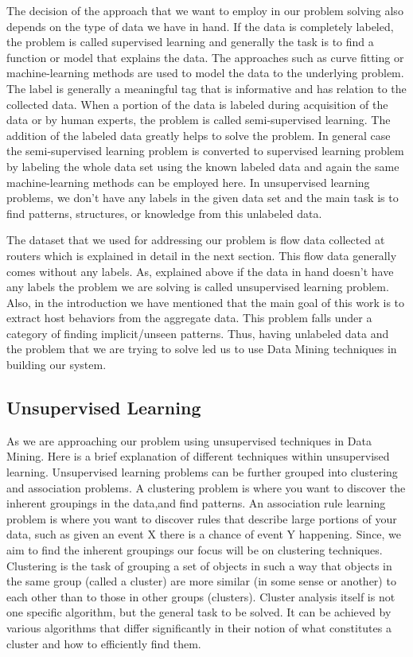 The decision of the approach that we want to employ in our problem solving also depends on the type of data we have in hand. If the data is completely labeled, the problem is called supervised learning and generally the task is to find a function or model that explains the data. The approaches such as curve fitting or machine-learning methods are used to model the data to the underlying problem. The label is generally a meaningful tag that is informative and has relation to the collected data.  When a portion of the data is labeled during acquisition of the data or by human experts, the problem is called semi-supervised learning. The addition of the labeled data greatly helps to solve the problem. In general case the semi-supervised learning problem is converted to supervised learning problem by labeling the whole data set using the known labeled data and again the same machine-learning methods can be employed here. In unsupervised learning problems, we don't have any labels in the given data set and the main task is to find patterns, structures, or knowledge from this unlabeled data.   

The dataset that we used for addressing our problem is flow data collected at routers which is explained in detail in the next section. This flow data generally comes without any labels. As, explained above if the data in hand doesn't have any labels the problem we are solving is called unsupervised learning problem. Also, in the introduction we have mentioned that the main goal of this work is to extract host behaviors from the aggregate data. This problem falls under a category of finding implicit/unseen patterns. Thus, having unlabeled data and the problem that we are trying to solve led us to use Data Mining techniques in building our system.

\subsection{Unsupervised Learning}  \label{unsupervised}
As we are approaching our problem using unsupervised techniques in Data Mining. Here is a brief explanation of different techniques within unsupervised learning.
Unsupervised learning problems can be further grouped into clustering and association problems. A clustering problem is where you want to discover the inherent groupings in the data,and find patterns. An association rule learning problem is where you want to discover rules that describe large portions of your data, such as given an event X there is a chance of event Y happening. Since, we aim to find the inherent groupings our focus will be on clustering techniques. Clustering is the task of grouping a set of objects in such a way that objects in the same group (called a cluster) are more similar (in some sense or another) to each other than to those in other groups (clusters). Cluster analysis itself is not one specific algorithm, but the general task to be solved. It can be achieved by various algorithms that differ significantly in their notion of what constitutes a cluster and how to efficiently find them.

